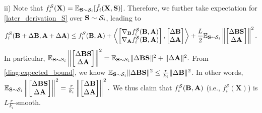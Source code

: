 \documentclass{article} %
\theoremstyle{plain}
\theoremstyle{definition}
\begin{document}
ii) Note that \(f_i^{\mathcal{S}}(\mathbf{X}) = \mathbb{E}_{{\bf S} \sim \mathcal{S}_i} [\tilde{f}_{i} ({\bf X}, {\bf S})] \).
Therefore, we further take expectation for \eqref{later_derivation_S} over \({\bf S} \sim \mathcal{S}_i\), leading to
\begin{align}
    f_i^{\mathcal{S}} ({\bf B} + \Delta {\bf B} , {\bf A}+ \Delta{\bf A}) \leq f_i^{\mathcal{S}} ({\bf B},{\bf A}) + 
    \left \langle \begin{bmatrix}
      \nabla_{\bf B} f_i^{\mathcal{S}}(\bf B,{\bf A}) \\
        \nabla_{\bf A} f_i^{\mathcal{S}} (\bf B,{\bf A})
    \end{bmatrix}, 
    \begin{bmatrix}
        \Delta {\bf B} \\
        \Delta {\bf A}  
    \end{bmatrix}
    \right \rangle + \frac{L}{2} \mathbb{E}_{{\bf S}\sim \mathcal{S}_i}\left \| \begin{bmatrix}
       \Delta {\bf B} {\bf S}\\
        \Delta {\bf A}
    \end{bmatrix} \right \|^2.  \nonumber 
\end{align}
In particular, \(\mathbb{E}_{{\bf S}\sim \mathcal{S}_i}\left \| \begin{bmatrix}
       \Delta {\bf B} {\bf S}\nonumber\\
        \Delta {\bf A}
    \end{bmatrix} \right \|^2 = \mathbb{E}_{{\bf S}\sim \mathcal{S}_i}\|{\Delta {\bf B}} {\bf S}\|^2 + \|\Delta {\bf A}\|^2. \) 
From \eqref{diag:expected_bound}, we know \(\mathbb{E}_{{\bf S}\sim \mathcal{S}_i}\|\Delta {\bf B} {\bf S}\|^2 \leq \frac{r}{k_i} \|\Delta {\bf B}\|^2\). 
In other words,
 \( \mathbb{E}_{{\bf S}\sim \mathcal{S}_i} \left \| \begin{bmatrix}
       {\Delta {\bf B}} {\bf S}\\
        \Delta {\bf A}
    \end{bmatrix} \right \|^2 = \frac{r}{k_i}\left \| \begin{bmatrix}
       \Delta {\bf B} \\
        \Delta {\bf A}
    \end{bmatrix} \right \|^2.
    \)
We thus claim that \(f_i^{\mathcal{S}} ({\bf B},{\bf A}) \) (i.e., \( f_i^{\mathcal{S}}(\mathbf{X}) \)) is \( L \frac{r}{k_i} \)-smooth.
\end{document}
